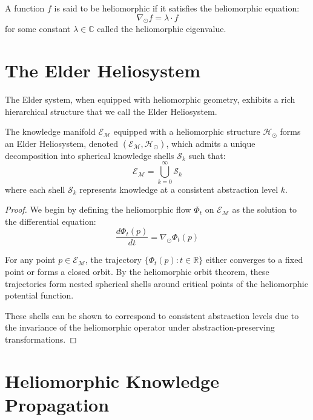 A function $f$ is said to be heliomorphic if it satisfies the heliomorphic equation:
\begin{equation}
\nabla_{\odot} f = \lambda \cdot f
\end{equation}
for some constant $\lambda \in \mathbb{C}$ called the heliomorphic eigenvalue.

\section{The Elder Heliosystem}

The Elder system, when equipped with heliomorphic geometry, exhibits a rich hierarchical structure that we call the Elder Heliosystem.

\begin{theorem}
The knowledge manifold $\mathcal{E}_{\mathcal{M}}$ equipped with a heliomorphic structure $\mathcal{H}_{\odot}$ forms an Elder Heliosystem, denoted $(\mathcal{E}_{\mathcal{M}}, \mathcal{H}_{\odot})$, which admits a unique decomposition into spherical knowledge shells $\mathcal{S}_k$ such that:
\begin{equation}
\mathcal{E}_{\mathcal{M}} = \bigcup_{k=0}^{\infty} \mathcal{S}_k
\end{equation}
where each shell $\mathcal{S}_k$ represents knowledge at a consistent abstraction level $k$.
\end{theorem}

\begin{proof}
We begin by defining the heliomorphic flow $\Phi_t$ on $\mathcal{E}_{\mathcal{M}}$ as the solution to the differential equation:
\begin{equation}
\frac{d\Phi_t(p)}{dt} = \nabla_{\odot} \Phi_t(p)
\end{equation}

For any point $p \in \mathcal{E}_{\mathcal{M}}$, the trajectory $\{\Phi_t(p) : t \in \mathbb{R}\}$ either converges to a fixed point or forms a closed orbit. By the heliomorphic orbit theorem, these trajectories form nested spherical shells around critical points of the heliomorphic potential function.

These shells can be shown to correspond to consistent abstraction levels due to the invariance of the heliomorphic operator under abstraction-preserving transformations.
\end{proof}

\section{Heliomorphic Knowledge Propagation}

